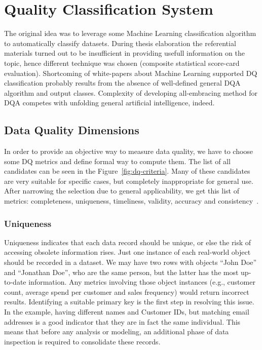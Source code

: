 \chapter{Quality Classification System}\label{ch:quality-classification-system}

The original idea was to leverage some Machine Learning classification algorithm to automatically classify datasets.
During thesis elaboration the referential materials turned out to be insufficient in providing usefull information on the topic, hence different technique was chosen (composite statistical score-card evaluation).
Shortcoming of white-papers about Machine Learning supported DQ classification probably results from the absence of well-defined general DQA algorithm and output classes.
Complexity of developing all-embracing method for DQA competes with unfolding general artificial intelligence, indeed.

\section{Data Quality Dimensions}\label{sec:data-quality-dimensions}


In order to provide an objective way to measure data quality, we have to choose some DQ metrics and define formal way to compute them.
The list of all candidates can be seen in the Figure~\ref{fig:dq-criteria}.
Many of these candidates are very suitable for specific cases, but completely inappropriate for general use.
After narrowing the selection due to general applicability, we get this list of metrics: completeness, uniqueness, timeliness, validity, accuracy and consistency~\cite{ehdi2019}.

\subsection{Uniqueness}

Uniqueness indicates that each data record should be unique, or else the risk of accessing obsolete information rises.
Just one instance of each real-world object should be recorded in a dataset.
We may have two rows with objects \enquote{John Doe} and \enquote{Jonathan Doe}, who are the same person, but the latter has the most up-to-date information.
Any metrics involving those object instances (e.g., customer count, average spend per customer and sales frequency) would return incorrect results.
Identifying a suitable primary key is the first step in resolving this issue.
In the example, having different names and Customer IDs, but matching email addresses is a good indicator that they are in fact the same individual.
This means that before any analysis or modeling, an additional phase of data inspection is required to consolidate these records.

